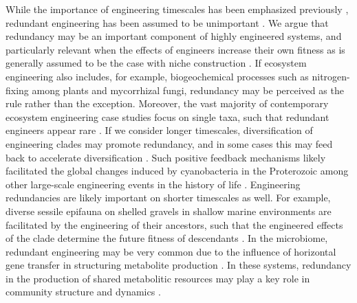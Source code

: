 \documentclass[twocolumn,preprintnumbers,amsmath,amssymb,superscriptaddress,linenumbers]{revtex4-1}
\providecommand{\DIFdelend}{} %
\DeclareRobustCommand{\DIFdelend}{\DIFOaddend \let\includegraphics\DIFOincludegraphics} %
\begin{document}
\DIFdelend While the importance of engineering timescales has been emphasized previously \cite{Hastings2007}, redundant engineering has been assumed to be unimportant \cite{Lawton1994}.
We argue that redundancy may be an important component of highly engineered systems, and particularly relevant when the effects of engineers increase their own fitness \cite{Cuddington2004} as is generally assumed to be the case with niche construction \cite{Krakauer2009}.
If ecosystem engineering also includes, for example, biogeochemical processes such as nitrogen-fixing among plants and mycorrhizal fungi, redundancy may be perceived as the rule rather than the exception.
Moreover, the vast majority of contemporary ecosystem engineering case studies focus on single taxa, such that redundant engineers appear rare \cite{Lawton1994}.
If we consider longer timescales, diversification of engineering clades may promote redundancy, and in some cases this may feed back to accelerate diversification \cite{OdlingSmee2013b}.
Such positive feedback mechanisms likely facilitated the global changes induced by cyanobacteria in the Proterozoic \cite{Erwin2008,Schirrmeister2013} among other large-scale engineering events in the history of life \cite{Erwin2008}.
Engineering redundancies are likely important on shorter timescales as well.
For example, diverse sessile epifauna on shelled gravels in shallow marine environments are facilitated by the engineering of their ancestors, such that the engineered effects of the clade determine the future fitness of descendants \cite{Kidwell1986}.
In the microbiome, redundant engineering may be very common due to the influence of horizontal gene transfer in structuring metabolite production \cite{Polz2013}.
In these systems, redundancy in the production of shared metabolitic resources may play a key role in community structure and dynamics \cite{Kallus2017,Butler2018}.
\end{document}
